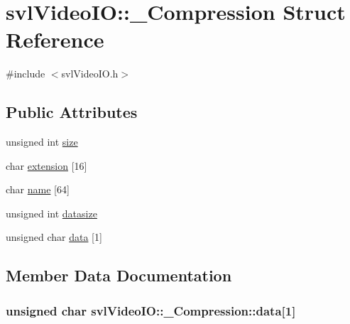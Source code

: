 \hypertarget{structsvl_video_i_o_1_1___compression}{}\section{svl\+Video\+I\+O\+:\+:\+\_\+\+Compression Struct Reference}
\label{structsvl_video_i_o_1_1___compression}


{\ttfamily \#include $<$svl\+Video\+I\+O.\+h$>$}

\subsection*{Public Attributes}
\begin{DoxyCompactItemize}
\item 
unsigned int \hyperlink{structsvl_video_i_o_1_1___compression_a82d6debeaf90fa62810321f750db7698}{size}
\item 
char \hyperlink{structsvl_video_i_o_1_1___compression_a37304e722770d959f8e7a145f970217c}{extension} \mbox{[}16\mbox{]}
\item 
char \hyperlink{structsvl_video_i_o_1_1___compression_a07b33b8e0f25c4109e482b82cfa556ea}{name} \mbox{[}64\mbox{]}
\item 
unsigned int \hyperlink{structsvl_video_i_o_1_1___compression_a6876320ec774c4563aec48b1cb5d1d52}{datasize}
\item 
unsigned char \hyperlink{structsvl_video_i_o_1_1___compression_a57ec1df325f407de8fb9cf39c89e28e1}{data} \mbox{[}1\mbox{]}
\end{DoxyCompactItemize}


\subsection{Member Data Documentation}
\hypertarget{structsvl_video_i_o_1_1___compression_a57ec1df325f407de8fb9cf39c89e28e1}{}
\subsubsection[{data}]{\setlength{\rightskip}{0pt plus 5cm}unsigned char svl\+Video\+I\+O\+::\+\_\+\+Compression\+::data\mbox{[}1\mbox{]}}\label{structsvl_video_i_o_1_1___compression_a57ec1df325f407de8fb9cf39c89e28e1}
\hypertarget{structsvl_video_i_o_1_1___compression_a6876320ec774c4563aec48b1cb5d1d52}{}
